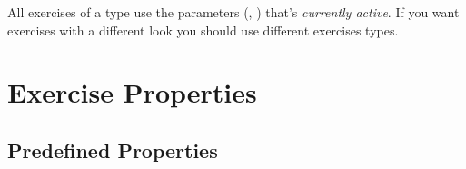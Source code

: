 \documentclass{xsim-manual}
\begin{document}
\begin{bewareofthedog}
  All exercises of a type use the parameters
  (\eg, ) that's \emph{currently active}.  If you
  want exercises with a different look you should use different exercises
  types.
\end{bewareofthedog}

\section{Exercise Properties}\label{sec:exercise-properties}

\subsection{Predefined Properties}
\end{document}
